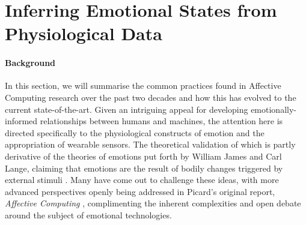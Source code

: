 \section{Inferring Emotional States from Physiological Data}
\label{lit_review:affective_computing}

\paragraph{Background}

In this section, we will summarise the common practices found in Affective Computing research over the past two decades and how this has evolved to the current state-of-the-art. Given an intriguing appeal for developing emotionally-informed relationships between humans and machines, the attention here is directed specifically to the physiological constructs of emotion and the appropriation of wearable sensors. The theoretical validation of which is partly derivative of the theories of emotions put forth by William James and Carl Lange, claiming that emotions are the result of bodily changes triggered by external stimuli \cite{james_principles_1890,cannon_james-lange_1927}. Many have come out to challenge these ideas, with more advanced perspectives openly being addressed in Picard's original report, \textit{Affective Computing} \cite{picard_affective_1995}, complimenting the inherent complexities and open debate around the subject of emotional technologies.

